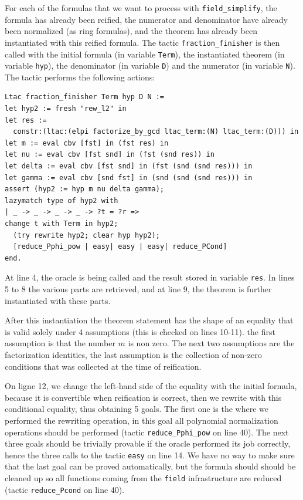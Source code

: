 \documentclass[11pt]{article}
\begin{document}
For each of the formulas that we want to process with {\tt field\_simplify},
the formula has already been reified, the numerator and denominator
have already been normalized (as ring formulas), and the theorem has already
been instantiated with this reified formula.  The tactic
{\tt fraction\_finisher} is then called with the initial formula
(in variable {\tt Term}), the instantiated theorem (in variable {\tt hyp}),
the denominator (in variable {\tt D}) and the numerator (in variable {\tt N}).
The tactic performs the following actions:
\begin{lstlisting}
Ltac fraction_finisher Term hyp D N :=
let hyp2 := fresh "rew_l2" in
let res :=
  constr:(ltac:(elpi factorize_by_gcd ltac_term:(N) ltac_term:(D))) in
let m := eval cbv [fst] in (fst res) in
let nu := eval cbv [fst snd] in (fst (snd res)) in
let delta := eval cbv [fst snd] in (fst (snd (snd res))) in
let gamma := eval cbv [snd fst] in (snd (snd (snd res))) in
assert (hyp2 := hyp m nu delta gamma);
lazymatch type of hyp2 with
| _ -> _ -> _ -> _ -> ?t = ?r =>
change t with Term in hyp2;
  (try rewrite hyp2; clear hyp hyp2);
  [reduce_Pphi_pow | easy| easy | easy| reduce_PCond]
end.
\end{lstlisting}
At line 4, the oracle is being called and the result stored in variable
{\tt res}.  In lines 5 to 8 the various parts are retrieved, and at
line 9, the theorem is further instantiated with these parts.

After this instantiation the theorem statement
has the shape of an equality that is
valid solely under 4 assumptions (this is checked on lines 10-11).  the first
assumption is that the
number \(m\) is non zero.  The next two assumptions are the factorization
identities, the last assumption is the collection of non-zero conditions
that was collected at the time of reification.

On ligne 12, we change the left-hand side
of the equality with the initial formula, because it is convertible
when reification is correct, then we rewrite with this conditional
equality, thus obtaining 5 goals.  The first one is the where we performed
the rewriting operation, in this goal all polynomial normalization operations
should be performed (tactic {\tt reduce\_Pphi\_pow} on line 40).  The next
three goals
should be trivially provable if the oracle performed its job correctly, hence
the three calls to the tactic {\tt easy} on line 14.  We have no way to make
sure that the last goal can be proved automatically, but the formula should
should be cleaned up so all functions coming from the {\tt field}
infrastructure are reduced (tactic {\tt reduce\_Pcond} on line 40).
\end{document}
